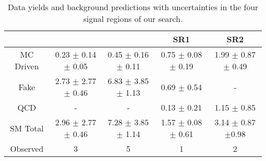 \begin{table}[!Hhtb]
\begin{center}
\begin{tabular}{c|c|c|c|c}
\hline
\hline
		& \eTau & \muTau & \tauTau SR1 & \tauTau SR2 \\
\hline
MC Driven & 0.23 $\pm$ 0.14 $\pm$ 0.05 & 0.45 $\pm$ 0.16  $\pm$ 0.11  &  0.75 $\pm$ 0.08 $\pm$ 0.19 & 1.99 $\pm$ 0.87 $\pm$ 0.49  \\
Fake      & 2.73 $\pm$ 2.77 $\pm$ 0.46 & 6.83 $\pm$ 3.85  $\pm$ 1.13  &     0.69 $\pm$ 0.54         &           -                 \\
QCD       &             -              &            -                 &     0.13 $\pm$ 0.21         &         1.15 $\pm$ 0.85     \\
\hline
SM Total  & 2.96 $\pm$ 2.77 $\pm$ 0.46 & 7.28 $\pm$ 3.85  $\pm$ 1.14  & 1.57 $\pm$ 0.08 $\pm$ 0.61  & 3.14  $\pm$ 0.87 $\pm$0.98  \\
\hline
\hline
Observed  &               3            &                5             &             1               & 2     \\  
\hline
\hline
\end{tabular}
\caption{Data yields and background predictions with uncertainties in the four signal regions of our search. 
}
\label{tbl:yieldSysSummary}
\end{center}
\end{table}

